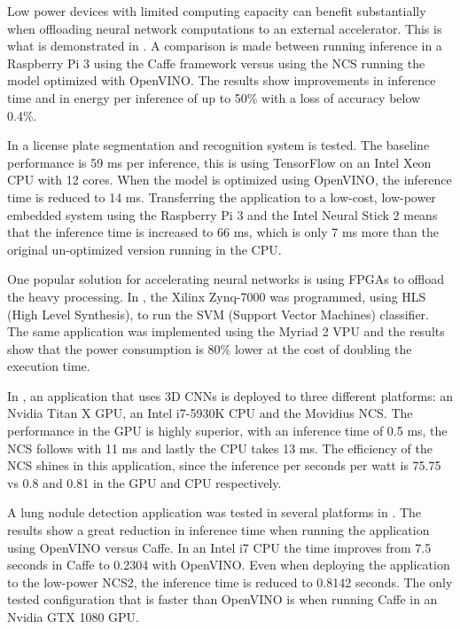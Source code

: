 Low power devices with limited computing capacity can benefit substantially when offloading neural network computations to an external accelerator. This is what is demonstrated in \cite{Benelli2019}. A comparison is made between running inference in a Raspberry Pi 3 using the Caffe framework versus using the NCS running the model optimized with OpenVINO. The results show improvements in inference time and in energy per inference of up to 50\% with a loss of accuracy below 0.4\%.

In \cite{Castro-Zunti2020} a license plate segmentation and recognition system is tested. The baseline performance is 59 ms per inference, this is using TensorFlow on an Intel Xeon CPU with 12 cores. When the model is optimized using OpenVINO, the inference time is reduced to 14 ms. Transferring the application to a low-cost, low-power embedded system using the Raspberry Pi 3 and the Intel Neural Stick 2 means that the inference time is increased to 66 ms, which is only 7 ms more than the original un-optimized version running in the CPU.

One popular solution for accelerating neural networks is using FPGAs to offload the heavy processing. In \cite{Marantos2018}, the Xilinx Zynq-7000 was programmed, using HLS (High Level Synthesis), to run the SVM (Support Vector Machines) classifier. The same application was implemented using the Myriad 2 VPU and the results show that the power consumption is 80\% lower at the cost of doubling the execution time.

In \cite{Xu2018}, an application that uses 3D CNNs is deployed to three different platforms: an Nvidia Titan X GPU, an Intel i7-5930K CPU and the Movidius NCS. The performance in the GPU is highly superior, with an inference time of 0.5 ms, the NCS follows with 11 ms and lastly the CPU takes 13 ms. The efficiency of the NCS shines in this application, since the inference per seconds per watt is 75.75 vs 0.8 and 0.81 in the GPU and CPU respectively.

A lung nodule detection application was tested in several platforms in \cite{Mathew2019}. The results show a great reduction in inference time when running the application using OpenVINO versus Caffe. In an Intel i7 CPU the time improves from 7.5 seconds in Caffe to 0.2304 with OpenVINO. Even when deploying the application to the low-power NCS2, the inference time is reduced to 0.8142 seconds. The only tested configuration that is faster than OpenVINO is when running Caffe in an Nvidia GTX 1080 GPU.
